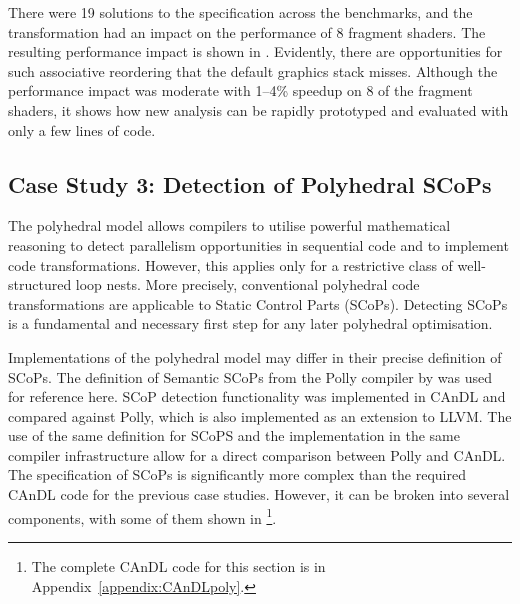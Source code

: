 
    There were 19 solutions to the specification across the benchmarks, and
    the transformation had an impact on the performance of 8 fragment shaders.
    The resulting performance impact is shown in .
    Evidently, there are opportunities for such associative reordering that
    the default graphics stack misses.
    Although the performance impact was moderate with 1--4\% speedup on 8
    of the fragment shaders, it shows how new analysis can be rapidly prototyped
    and evaluated with only a few lines of code.

\subsection{Case Study 3: Detection of Polyhedral SCoPs}

    The polyhedral model
    \citep{Karp:1967:OCU:321406.321418,benabderrahmane2010polyhedral} allows
    compilers to utilise powerful mathematical reasoning to detect parallelism
    opportunities in sequential code and to implement code transformations.
    However, this applies only for a restrictive class of well-structured loop
    nests.
    More precisely, conventional polyhedral code transformations are applicable
    to Static Control Parts (SCoPs).
    Detecting SCoPs is a fundamental and necessary first step for any later
    polyhedral optimisation.

    Implementations of the polyhedral model may differ in their precise
    definition of SCoPs.
    The definition of Semantic SCoPs from the Polly compiler by
    \citet{Lengauer2012Polly} was used for reference here.
    SCoP detection functionality was implemented in CAnDL and compared against
    Polly, which is also implemented as an extension to LLVM.
    The use of the same definition for SCoPS and the implementation in the same
    compiler infrastructure allow for a direct comparison between Polly and
    CAnDL.
    The specification of SCoPs is significantly more complex than the required
    CAnDL code for the previous case studies.
    However, it can be broken into several components, with some of them shown
    in 
    \footnote{The complete CAnDL code for this section is in
    Appendix~\ref{appendix:CAnDLpoly}.}.


